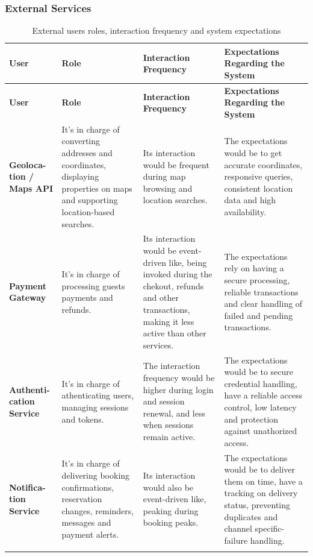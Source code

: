 \subsubsection{External Services}
\begin{longtable}{|L{0.15\textwidth}|L{0.27\textwidth}|L{0.25\textwidth}|L{0.27\textwidth}|}
    \hline
    \textbf{User} &
    \textbf{Role} &
    \textbf{Interaction Frequency} &
    \textbf{Expectations Regarding the System} \\
    \hline
    \endfirsthead

    \hline
    \textbf{User} &
    \textbf{Role} &
    \textbf{Interaction Frequency} &
    \textbf{Expectations Regarding the System} \\
    \hline
    \endhead

    \textbf{Geoloca-tion / Maps API} &
    It's in charge of converting addresses and coordinates, displaying properties on maps and supporting 
    location-based searches. &
    Its interaction would be frequent during map browsing and location searches. &
    The expectations would be to get accurate coordinates, responsive queries, consistent location data and high 
    availability. \\
    \hline

    \textbf{Payment Gateway} &
    It's in charge of processing guests payments and refunds. &
    Its interaction would be event-driven like, being invoked during the chekout, refunds and other transactions, 
    making it less active than other services. &
    The expectations rely on having a secure processing, reliable transactions and clear handling of failed and 
    pending transactions. \\
    \hline

    \textbf{Authenti-cation Service} &
    It's in charge of athenticating users, managing sessions and tokens. &
    The interaction frequency would be higher during login and session renewal, and less when sessions remain 
    active. &
    The expectations would be to secure credential handling, have a reliable access control, low latency and 
    protection against unathorized access. \\
    \hline

    \textbf{Notifica-tion Service} &
    It's in charge of delivering booking confirmations, reservation changes, reminders, messages and payment alerts. &
    Its interaction would also be event-driven like, peaking during booking peaks. &
    The expectations would be to deliver them on time, have a tracking on delivery status, preventing duplicates and 
    channel specific-failure handling. \\
    \hline

    \caption{External users roles, interaction frequency and system expectations}
    \label{tab:external_services}
\end{longtable}

